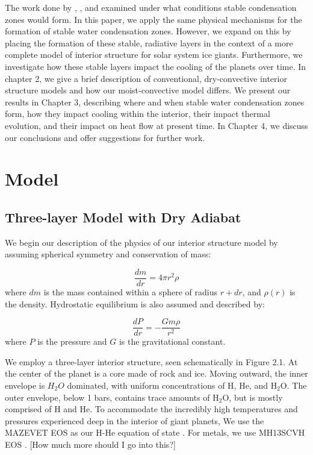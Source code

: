 \documentclass[11pt]{ucscthesisbs}
\begin{document}
The work done by \citep{guillot_1995}, \citep{friedson_2017}, and \citep{leconte_2017} examined under what conditions stable condensation zones would form. In this paper, we apply the same physical mechanisms for the formation of stable water condensation zones. However, we expand on this by placing the formation of these stable, radiative layers in the context of a more complete model of interior structure for solar system ice giants. Furthermore, we investigate how these stable layers impact the cooling of the planets over time. In chapter 2, we give a brief description of conventional, dry-convective interior structure models and how our moist-convective model differs. We present our results in Chapter 3, describing where and when stable water condensation zones form, how they impact cooling within the interior, their impact thermal evolution, and their impact on heat flow at present time. In Chapter 4, we discuss our conclusions and offer suggestions for further work.


\chapter{Model}

\section{Three-layer Model with Dry Adiabat}
\label{Three-layer Model with Dry Adiabat}
We begin our description of the physics of our interior structure model by assuming spherical symmetry and conservation of mass:

\begin{equation}
  \frac{dm}{dr} =4 \pi r^{2}\rho  
\end{equation}
where $dm$ is the mass contained within a sphere of radius $r + dr$, and $\rho(r)$ is the density. Hydrostatic equilibrium is also assumed and described by:

\begin{equation}
  \frac{dP}{dr} = -\frac{Gm\rho}{r^{2}}  
\end{equation}
where $P$ is the pressure and $G$ is the gravitational constant. 

We employ a three-layer interior structure, seen schematically in Figure 2.1. At the center of the planet is a core made of rock and ice. Moving outward, the inner envelope is $H_{2}O$ dominated, with uniform concentrations of H, He, and H$_{{2}}$O. The outer envelope, below 1 bars, contains trace amounts of H$_{2}$O, but is mostly comprised of H and He. To accommodate the incredibly high temperatures and pressures experienced deep in the interior of giant planets, We use the MAZEVET EOS as our H-He equation of state \citep{mazevet_2019}. For metals, we use MH13SCVH EOS \citep{miguel_2018}. [How much more should I go into this?]
\end{document}
